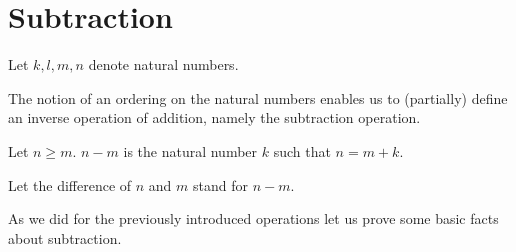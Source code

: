 \documentclass[../../arithmetic.tex]{subfiles}
\begin{document}
  \section{Subtraction}

  \begin{forthel}
  \end{forthel}

  \begin{forthel}
  \end{forthel}

  \begin{forthel}
    Let $k, l, m, n$ denote natural numbers.
  \end{forthel}

  \noindent The notion of an ordering on the natural numbers enables us to
  (partially) define an inverse operation of addition, namely the subtraction
  operation.

  \begin{forthel}
    \begin{definition}
      Let $n \geq m$.
      $n - m$ is the natural number $k$ such that $n = m + k$.
    \end{definition}

    Let the difference of $n$ and $m$ stand for $n - m$.
  \end{forthel}

  \noindent As we did for the previously introduced operations let us prove
  some basic facts about subtraction.
\end{document}
